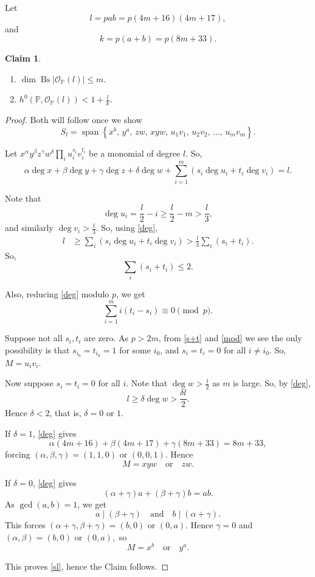 \documentclass[11pt,letterpaper]{amsart}
\newtheorem{claim}[lemma]{Claim}
\begin{document}
Let
\[
l=pab
=p(4m+16)(4m+17),
\]
and
\[
k=p(a+b)=p(8m+33).
\]

\begin{claim}\label{bs}
\begin{enumerate}
\item[(1)] $\dim \operatorname{Bs}|\mathcal O_{\mathbb P}(l)|\le m$.

\item[(2)] $
h^0(\mathbb P,\mathcal O_{\mathbb P}(l))
<
1+\frac{l}{k}.$
\end{enumerate}
\end{claim}

\begin{proof}
Both will follow once we show
\begin{equation}\label{sl}
S_l=
\operatorname{span}
\left\{
x^b,\,
y^a,\,
zw,\,
xyw,\,
u_1v_1,\,
u_2v_2,\,
\ldots,\,
u_mv_m
\right\}.
\end{equation}

Let $x^\alpha y^\beta z^\gamma w^\delta
\prod_i u_i^{s_i}v_i^{t_i}$
be a monomial of degree $l$. So,
\begin{equation}\label{deg}
\alpha\deg x+\beta\deg y+\gamma\deg z+\delta\deg w
+\sum_{i=1}^{m}\left(s_i\deg u_i+t_i\deg v_i\right)=l.
\end{equation}

Note that
\[
\deg u_i=\frac{l}{2}-i\ge \frac{l}{2}-m>\frac{l}{3},
\]
and similarly $\deg v_i>\frac{l}{3}$. So, using \eqref{deg},
\begin{align*}
l
&\ge
\sum_i\left(s_i\deg u_i+t_i\deg v_i\right)
>
\frac{l}{3}\sum_i(s_i+t_i).
\end{align*}
So,
\begin{equation}\label{s+t}
\sum_i(s_i+t_i)\le 2.
\end{equation}

Also, reducing \ref{deg} modulo $p$, we get
\begin{equation}\label{mod}
\sum_{i=1}^m i(t_i-s_i)\equiv 0 \pmod p.
\end{equation}

Suppose not all $s_i,t_i$ are zero. As $p>2m$, from \eqref{s+t} and \eqref{mod} we see the only possibility is that
$s_{i_0}=t_{i_0}=1$ for some $i_0$, and
$s_i=t_i=0$ for all $i\neq i_0$. So, $M=u_iv_i.$

Now suppose $s_i=t_i=0$ for all $i$. Note that
$\deg w>\frac{l}{2}$ as $m$ is large. So, by \eqref{deg},
\[
l\ge \delta\deg w>\frac{\delta l}{2}.
\]
Hence $\delta<2$, that is, $\delta=0$ or $1$.

If $\delta=1$, \eqref{deg} gives
\[
\alpha(4m+16)+\beta(4m+17)+\gamma(8m+33)=8m+33,
\]
forcing $(\alpha,\beta,\gamma)=(1,1,0)
\text{ or }
(0,0,1).$
Hence
\[
M=xyw \quad\text{or}\quad zw.
\]

If $\delta=0$, \eqref{deg} gives
\[
(\alpha+\gamma)a+(\beta+\gamma)b=ab.
\]
As $\gcd(a,b)=1$, we get
\[
a\mid (\beta+\gamma)
\quad\text{and}\quad
b\mid (\alpha+\gamma).
\]
This forces $(\alpha+\gamma,\beta+\gamma)=(b,0)
\text{ or }
(0,a).$
Hence $\gamma=0$ and $(\alpha,\beta)=(b,0)
\text{ or }
(0,a),$
so
\[
M=x^b \quad\text{or}\quad y^a.
\]

This proves \eqref{sl}, hence the Claim follows.
\end{proof}
\end{document}
